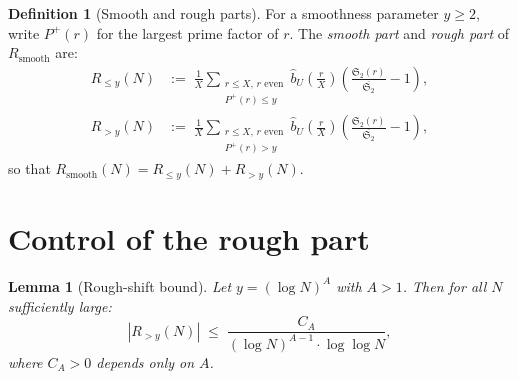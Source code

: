 \documentclass[11pt,reqno]{amsart}
\theoremstyle{plain}
\newtheorem{lemma}[theorem]{Lemma}
\theoremstyle{definition}
\newtheorem{definition}[theorem]{Definition}
\theoremstyle{remark}
\newcommand{\Rsmooth}{R_{\mathrm{smooth}}}
\newcommand{\Sfrak}{\mathfrak{S}_2}
\newcommand{\Pplus}{P^{+}}
\begin{document}
\begin{definition}[Smooth and rough parts]\label{def:strat}
For a smoothness parameter $y \ge 2$, write
$\Pplus(r)$ for the largest prime factor of $r$.
The \emph{smooth part} and \emph{rough part} of $\Rsmooth$ are:
\begin{align}
  R_{\le y}(N) &:=\; \frac{1}{X}
  \sum_{\substack{r \le X,\, r \text{ even} \\ \Pplus(r) \le y}}
  \hat{b}_U\!\left(\frac{r}{X}\right)
  \left(\frac{\Sfrak(r)}{\overline{\Sfrak}} - 1\right),
  \label{eq:Rley}\\
  R_{> y}(N) &:=\; \frac{1}{X}
  \sum_{\substack{r \le X,\, r \text{ even} \\ \Pplus(r) > y}}
  \hat{b}_U\!\left(\frac{r}{X}\right)
  \left(\frac{\Sfrak(r)}{\overline{\Sfrak}} - 1\right),
  \label{eq:Rgty}
\end{align}
so that $\Rsmooth(N) = R_{\le y}(N) + R_{> y}(N)$.
\end{definition}

\section{Control of the rough part}\label{sec:rough}

\begin{lemma}[Rough-shift bound]\label{lem:rough}
Let $y = (\log N)^A$ with $A > 1$. Then for all $N$ sufficiently large:
\[
  |R_{> y}(N)| \;\le\;
  \frac{C_A}{(\log N)^{A-1} \cdot \log\log N},
\]
where $C_A > 0$ depends only on $A$.
\end{lemma}
\end{document}

